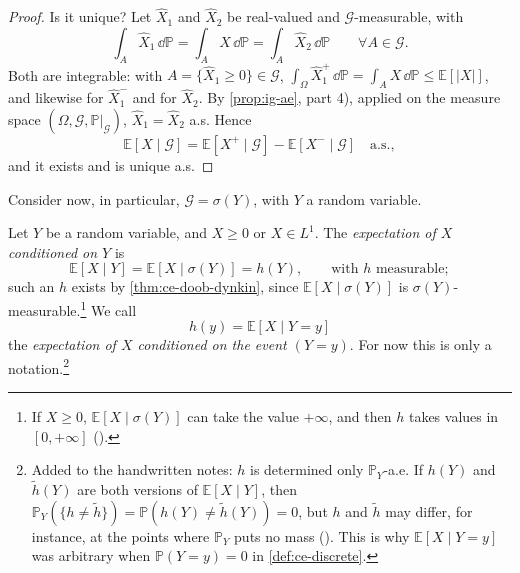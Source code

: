 \begin{proof}
Is it unique? Let $\hat X_1$ and $\hat X_2$ be real-valued and $\mathcal G$-measurable, with
\[
  \int_A\hat X_1\,\dd\mathbb P=\int_AX\,\dd\mathbb P=\int_A\hat X_2\,\dd\mathbb P\qquad\forall A\in\mathcal G .
\]
Both are integrable: with $A=\{\hat X_1\ge0\}\in\mathcal G$, $\int_\Omega\hat X_1^+\,\dd\mathbb P=\int_AX\,\dd\mathbb P\le\mathbb E[|X|]$,
and likewise for $\hat X_1^-$ and for $\hat X_2$. By \cref{prop:ig-ae}, part 4), applied on the
measure space $(\Omega,\mathcal G,\mathbb P|_{\mathcal G})$, $\hat X_1=\hat X_2$ a.s. Hence
\[
  \mathbb E[X\mid\mathcal G]=\mathbb E[X^+\mid\mathcal G]-\mathbb E[X^-\mid\mathcal G]\quad\text{a.s.},
\]
and it exists and is unique a.s.
\end{proof}

Consider now, in particular, $\mathcal G=\sigma(Y)$, with $Y$ a random variable.

\begin{definition}\label{def:ce-given-Y}
Let $Y$ be a random variable, and $X\ge0$ or $X\in L^1$. The \emph{expectation of $X$
conditioned on $Y$} is
\[
  \mathbb E[X\mid Y]=\mathbb E[X\mid\sigma(Y)]=h(Y),\qquad\text{with $h$ measurable};
\]
such an $h$ exists by \cref{thm:ce-doob-dynkin}, since $\mathbb E[X\mid\sigma(Y)]$ is
$\sigma(Y)$-measurable.\footnote{If $X\ge0$, $\mathbb E[X\mid\sigma(Y)]$ can take the value
$+\infty$, and then $h$ takes values in $[0,+\infty]$ ().} We call
\[
  h(y)=\mathbb E[X\mid Y=y]
\]
the \emph{expectation of $X$ conditioned on the event $(Y=y)$}. For now this is only a
notation.\footnote{Added to the handwritten notes: $h$ is determined only $\mathbb P_Y$-a.e.
If $h(Y)$ and $\tilde h(Y)$ are both versions of $\mathbb E[X\mid Y]$, then
$\mathbb P_Y(\{h\ne\tilde h\})=\mathbb P(h(Y)\ne\tilde h(Y))=0$, but $h$ and $\tilde h$ may
differ, for instance, at the points where $\mathbb P_Y$ puts no mass ().
This is why $\mathbb E[X\mid Y=y]$ was arbitrary when $\mathbb P(Y=y)=0$ in
\cref{def:ce-discrete}.}
\end{definition}

